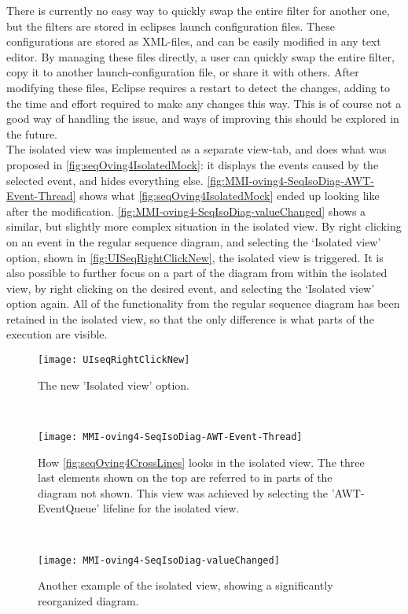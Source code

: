 There is currently no easy way to quickly swap the entire filter for another one, but the filters are stored in eclipses launch configuration files.
These configurations are stored as XML-files, and can be easily modified in any text editor.
By managing these files directly, a user can quickly swap the entire filter, copy it to another launch-configuration file, or share it with others.
After modifying these files, Eclipse requires a restart to detect the changes, adding to the time and effort required to make any changes this way.
This is of course not a good way of handling the issue, and ways of improving this should be explored in the future.
~\\

The isolated view was implemented as a separate view-tab, and does what was proposed in \autoref{fig:seqOving4IsolatedMock}: it displays the events caused by the selected event, and hides everything else.
\autoref{fig:MMI-oving4-SeqIsoDiag-AWT-Event-Thread} shows what \autoref{fig:seqOving4IsolatedMock} ended up looking like after the modification.
\autoref{fig:MMI-oving4-SeqIsoDiag-valueChanged} shows a similar, but slightly more complex situation in the isolated view.
By right clicking on an event in the regular sequence diagram, and selecting the `Isolated view' option, shown in \autoref{fig:UISeqRightClickNew},  the isolated view is triggered.
It is also possible to further focus on a part of the diagram from within the isolated view, by right clicking on the desired event, and selecting the `Isolated view' option again.
All of the functionality from the regular sequence diagram has been retained in the isolated view, so that the only difference is what parts of the execution are visible.
\begin{figure}[H]
	\centering
	\texttt{[image: UIseqRightClickNew]}
	\caption{The new 'Isolated view' option.}
	\label{fig:UISeqRightClickNew}
\end{figure}
~\\
\begin{figure}[H]
	\centering
	\texttt{[image: MMI-oving4-SeqIsoDiag-AWT-Event-Thread]}
	\caption[How \autoref{fig:seqOving4CrossLines} looks in the isolated view.]{How \autoref{fig:seqOving4CrossLines} looks in the isolated view. The three last elements shown on the top are referred to in parts of the diagram not shown. This view was achieved by selecting the 'AWT-EventQueue' lifeline for the isolated view.}
	\label{fig:MMI-oving4-SeqIsoDiag-AWT-Event-Thread}
\end{figure}
~\\
\begin{figure}[H]
	\centering
	\texttt{[image: MMI-oving4-SeqIsoDiag-valueChanged]}
	\caption{Another example  of the isolated view, showing a significantly reorganized diagram.}
	\label{fig:MMI-oving4-SeqIsoDiag-valueChanged}
\end{figure}
 ~\\

